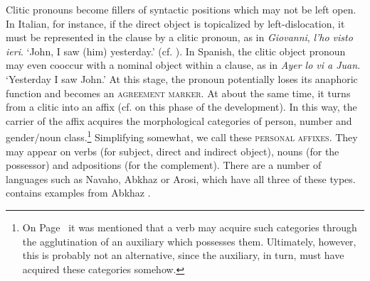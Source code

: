 Clitic pronouns become fillers of syntactic positions which may not be left open. In Italian, for instance, if the direct object is topicalized by left-dislocation, it must be represented in the clause by a clitic pronoun, as in \textit{Giovanni}, \textit{l'ho visto ieri}. ‘John, I saw (him) yesterday.’ (cf. \citealt[154]{MallinsonEtAl1981}). In Spanish, the clitic object pronoun may even cooccur with a nominal object within a clause, as in \textit{Ayer lo vi a Juan}. ‘Yesterday I saw John.’\label{page44} At this stage, the pronoun potentially loses its anaphoric function and becomes an \textsc{agreement marker}. At about the same time, it turns from a clitic into an affix (cf. \citealt[496f]{Humboldt1836} on this phase of the development). In this way, the carrier of the affix acquires the morphological categories of person, number and gender/noun class.\footnote{On Page~\pageref{page31}\chkfn%
it was mentioned that a verb may acquire such categories through the agglutination of an auxiliary which possesses them. Ultimately, however, this is probably not an alternative, since the auxiliary, in turn, must have acquired these categories somehow.} Simplifying somewhat, we call these \textsc{personal affixes}. They may appear on verbs (for subject, direct and indirect object), nouns (for the possessor) and adpositions (for the complement). There are a number of languages such as Navaho, Abkhaz or Arosi, which have all three of these types.  contains examples from Abkhaz \citep[105, 116, 103]{Hewitt1979}.

